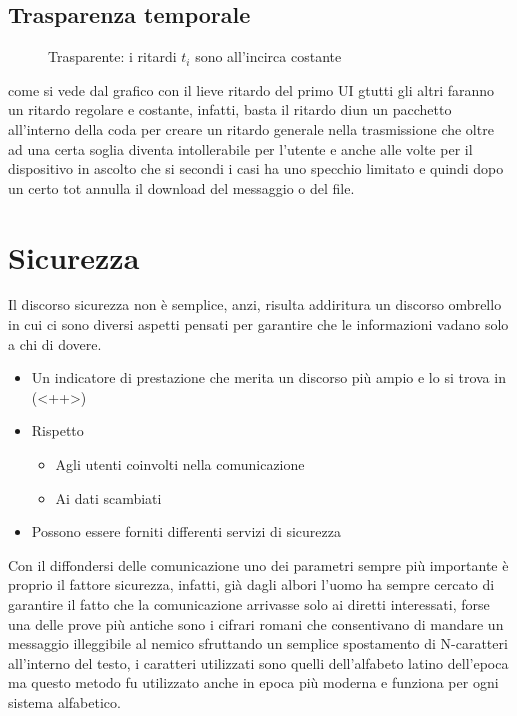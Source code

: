 \subsection{Trasparenza temporale}
\label{sec:trasptemp}
\begin{figure}[ht!]
  \centering
  \resizebox{6in}{!}{}
  \caption{Trasparente: i ritardi $t_i$ sono all'incirca costante}
  \label{fig:trasptemp}
\end{figure}
\begin{nota}
  come si vede dal grafico con il lieve ritardo del primo UI gtutti gli altri faranno un ritardo regolare e
  costante, infatti, basta il ritardo diun un pacchetto all'interno della coda per creare un ritardo generale
  nella trasmissione che oltre ad una certa soglia diventa intollerabile per l'utente e anche alle volte per
  il dispositivo in ascolto che si secondi i casi ha uno specchio limitato e quindi dopo un certo tot annulla
  il download del messaggio o del file.
\end{nota}
\section{Sicurezza}
\label{sec:sicurezza}
Il discorso sicurezza non è semplice, anzi, risulta addiritura un discorso ombrello in cui ci sono diversi
aspetti pensati per garantire che le informazioni vadano solo a chi di dovere.
\begin{itemize}
\item Un indicatore di prestazione che merita un discorso più ampio e lo si trova in (<++>)
\item Rispetto
  \begin{itemize}
  \item Agli utenti coinvolti nella comunicazione
  \item Ai dati scambiati
  \end{itemize}
\item Possono essere forniti differenti servizi di sicurezza
\end{itemize}
\clearpage
\begin{oss}
  Con il diffondersi delle comunicazione uno dei parametri sempre più importante è proprio il fattore sicurezza,
  infatti, già dagli albori l'uomo ha sempre cercato di garantire il fatto che la comunicazione arrivasse solo
  ai diretti interessati, forse una delle prove più antiche sono i cifrari romani che consentivano di mandare
  un messaggio illeggibile al nemico sfruttando un semplice spostamento di N-caratteri all'interno del testo,
  i caratteri utilizzati sono quelli dell'alfabeto latino dell'epoca ma questo metodo fu utilizzato anche in epoca
  più moderna e funziona per ogni sistema alfabetico. 
\end{oss}
